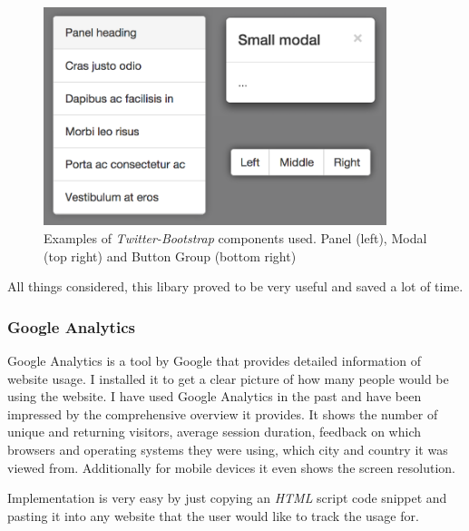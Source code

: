 \documentclass[a4paper,11pt,twoside]{article}
\begin{document}
\begin{figure}[ht!]
\centering
\includegraphics[width=100mm]{graphics/twitterBootstrap_01.png}
\caption{Examples of \textit{Twitter-Bootstrap} components used. Panel (left), Modal (top right) and Button Group (bottom right)}
\label{fig:UIdesign1}
\end{figure}



All things considered, this libary proved to be very useful and saved a lot of time.




\subsubsection{Google Analytics}

Google Analytics is a tool by Google that provides detailed information of website usage. I installed it to get a clear picture of how many people would be using the website. I have used Google Analytics in the past and have been impressed by the comprehensive overview it provides. It shows the number of unique and returning visitors, average session duration, feedback on which browsers and operating systems they were using, which city and country it was viewed from. Additionally for mobile devices it even shows the screen resolution.

Implementation is very easy by just copying an \textit{HTML} script code snippet and pasting it into any website that the user would like to track the usage for.
\end{document}
